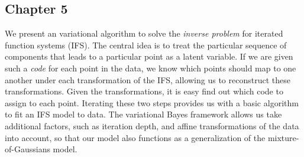 \documentclass{scrartcl}
\begin{document}
\subsection{Chapter 5}

We present an variational algorithm to solve the \emph{inverse problem} for iterated function systems (IFS). The central idea is to treat the particular sequence of components that leads to a particular point as a latent variable. If we are given such a \emph{code} for each point in the data, we know which points should map to one another under each transformation of the IFS, allowing us to reconstruct these transformations. Given the transformations, it is easy find out which code to assign to each point. Iterating these two steps provides us with a basic algorithm to fit an IFS model to data. The variational Bayes framework allows us take additional factors, such as iteration depth, and affine transformations of the data into account, so that our model also functions as a generalization of the mixture-of-Gaussians model.
\end{document}
